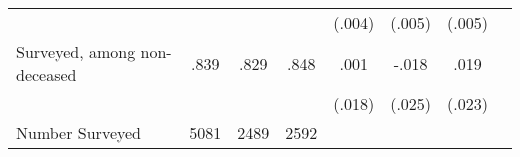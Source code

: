 \begin{tabular}{l*{7}{c}}
                    &            &            &            &      (.004)         &      (.005)         &      (.005)         \\
Surveyed, among non-deceased&        .839&        .829&        .848&        .001         &       -.018         &        .019         \\
                    &            &            &            &      (.018)         &      (.025)         &      (.023)         \\
Number Surveyed     &        5081&        2489&        2592&                     &                     &                     \\
\bottomrule
\end{tabular}
